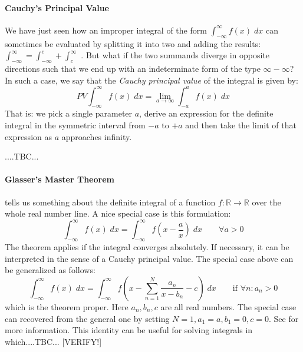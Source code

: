 


\paragraph{Cauchy's Principal Value}
We have just seen how an improper integral of the form $\int_{-\infty}^{\infty} f(x) \; dx$ can sometimes be evaluated by splitting it into two and adding the results:  $\int_{-\infty}^{\infty} = \int_{-\infty}^c + \int_c^{\infty}$ . But what if the two summands diverge in opposite directions such that we end up with an indeterminate form of the type $\infty - \infty$? In such a case, we say that the \emph{Cauchy principal value} of the integral is given by:
\begin{equation}
PV \int_{-\infty}^{\infty} f(x) \; dx = \lim_{a \rightarrow \infty} \int_{-a}^a f(x) \; dx
\end{equation}
That is: we pick a single parameter $a$, derive an expression for the definite integral in the symmetric interval from $-a$ to $+a$ and then take the limit of that expression as $a$ approaches infinity.




....TBC...



\paragraph{Glasser's Master Theorem} tells us something about the definite integral of a function $f: \mathbb{R} \rightarrow \mathbb{R}$ over the whole real number line. A nice special case is this formulation:
\begin{equation}
 \int_{-\infty}^{\infty} f(x) \; dx  = 
 \int_{-\infty}^{\infty} f(x - \frac{a}{x}) \; dx 
 \qquad \forall a > 0
\end{equation}
The theorem applies if the integral converges absolutely. If necessary, it can be interpreted in the sense of a Cauchy principal value. The special case above can be generalized as follows:
\begin{equation}
 \int_{-\infty}^{\infty} f(x) \; dx  = 
 \int_{-\infty}^{\infty} f \left( x - \sum_{n=1}^N \frac{a_n}{x - b_n} - c \right) \; dx 
 \qquad \text{if } \forall n: a_n > 0
\end{equation}
which is the theorem proper. Here $a_n, b_n, c$ are all real numbers. The special case can recovered from the general one by setting $N=1, a_1=a, b_1=0, c=0$. See \cite{WK_GlasserMaster} for more information. This identity can be useful for solving integrals in which....TBC...
[VERIFY!]



